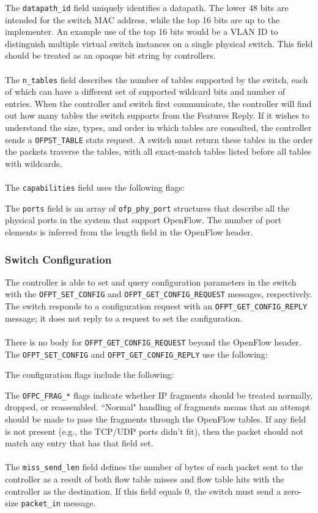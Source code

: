 
The \verb|datapath_id| field uniquely identifies a datapath.  The lower 48 bits are intended for the switch MAC address, while the top 16 bits are up to the implementer.  An example use of the top 16 bits would be a VLAN ID to distinguish multiple virtual switch instances on a single physical switch.  This field should be treated as an opaque bit string by controllers.
\\\\
The \verb|n_tables| field describes the number of tables supported by the switch, each of which can have a different set of supported wildcard bits and number of entries.  When the controller and switch first communicate, the controller will find out how many tables the switch supports from the Features Reply. If it wishes to understand the size, types, and order in which tables are consulted, the controller sends a \verb|OFPST_TABLE| stats request. A switch must return these tables in the order the packets traverse the tables, with all exact-match tables listed before all tables with wildcards.
\\\\
The \verb|capabilities| field uses the following flags:

 
The \verb|ports| field is an array of \verb|ofp_phy_port| structures that describe all the physical ports in the system that support OpenFlow.  The number of port elements is inferred from the length field in the OpenFlow header. 

\subsubsection{Switch Configuration}
The controller is able to set and query configuration parameters in the switch with the \verb|OFPT_SET_CONFIG| and \verb|OFPT_GET_CONFIG_REQUEST| messages, respectively.  The switch responds to a configuration request with an \verb|OFPT_GET_CONFIG_REPLY| message; it does not reply to a request to set the configuration.  
\\\\
There is no body for \verb|OFPT_GET_CONFIG_REQUEST| beyond the OpenFlow header.  The \verb|OFPT_SET_CONFIG| and \verb|OFPT_GET_CONFIG_REPLY| use the following:


The configuration flags include the following:


The \verb|OFPC_FRAG_*| flags indicate whether IP fragments should be treated normally, dropped, or reassembled.  ``Normal" handling of fragments means that an attempt should be made to pass the fragments through the OpenFlow tables. If any field is not present (e.g., the TCP/UDP ports didn't fit), then the packet should not match any entry that has that field set.
\\\\
The \verb|miss_send_len| field defines the number of bytes of each packet sent to the controller as a result of both flow table misses and flow table hits with the controller as the destination.  If this field equals 0, the switch must send a zero-size \verb|packet_in| message.

